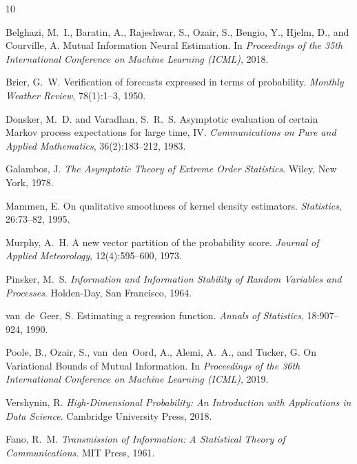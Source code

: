 \documentclass[11pt,a4paper]{article}
\theoremstyle{definition}
\begin{document}

\begin{thebibliography}{10}

Belghazi, M.~I., Baratin, A., Rajeshwar, S., Ozair, S., Bengio, Y., Hjelm, D., and Courville, A.
\newblock Mutual Information Neural Estimation.
\newblock In \emph{Proceedings of the 35th International Conference on Machine Learning (ICML)}, 2018.

Brier, G.~W.
\newblock Verification of forecasts expressed in terms of probability.
\newblock \emph{Monthly Weather Review}, 78(1):1--3, 1950.

Donsker, M.~D. and Varadhan, S.~R.~S.
\newblock Asymptotic evaluation of certain Markov process expectations for large time, IV.
\newblock \emph{Communications on Pure and Applied Mathematics}, 36(2):183--212, 1983.

Galambos, J.
\newblock \emph{The Asymptotic Theory of Extreme Order Statistics}.
\newblock Wiley, New York, 1978.

Mammen, E.
\newblock On qualitative smoothness of kernel density estimators.
\newblock \emph{Statistics}, 26:73--82, 1995.

Murphy, A.~H.
\newblock A new vector partition of the probability score.
\newblock \emph{Journal of Applied Meteorology}, 12(4):595--600, 1973.

Pinsker, M.~S.
\newblock \emph{Information and Information Stability of Random Variables and Processes}.
\newblock Holden-Day, San Francisco, 1964.

van~de~Geer, S.
\newblock Estimating a regression function.
\newblock \emph{Annals of Statistics}, 18:907--924, 1990.

Poole, B., Ozair, S., van~den~Oord, A., Alemi, A.~A., and Tucker, G.
\newblock On Variational Bounds of Mutual Information.
\newblock In \emph{Proceedings of the 36th International Conference on Machine Learning (ICML)}, 2019.

Vershynin, R.
\newblock \emph{High-Dimensional Probability: An Introduction with Applications in Data Science}.
\newblock Cambridge University Press, 2018.

Fano, R.~M.
\newblock \emph{Transmission of Information: A Statistical Theory of Communications}.
\newblock MIT Press, 1961.


\end{thebibliography}
\end{document}
